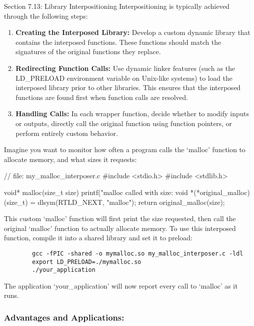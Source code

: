 \begin{notes}{Section 7.13: Library Interpositioning}
    Interpositioning is typically achieved through the following steps:
    \begin{enumerate}
        \item \textbf{Creating the Interposed Library:} Develop a custom dynamic library that contains the interposed functions. These functions should match the signatures of the original functions they replace.
        \item \textbf{Redirecting Function Calls:} Use dynamic linker features (such as the LD\_PRELOAD environment variable on Unix-like systems) to load the interposed library prior to other libraries. 
        This ensures that the interposed functions are found first when function calls are resolved.
        \item \textbf{Handling Calls:} In each wrapper function, decide whether to modify inputs or outputs, directly call the original function using function pointers, or perform entirely custom behavior.
    \end{enumerate}
    
    \begin{highlight}
        Imagine you want to monitor how often a program calls the `malloc' function to allocate memory, and what sizes it requests:
    \begin{code}[C]
    // file: my_malloc_interposer.c
    #include <stdio.h>
    #include <stdlib.h>

    void* malloc(size_t size) {
        printf("malloc called with size: %
        void *(*original_malloc)(size_t) = dlsym(RTLD_NEXT, "malloc");
        return original_malloc(size);
    }
    \end{code}
        This custom `malloc' function will first print the size requested, then call the original `malloc' function to actually allocate memory. To use this interposed function, compile it into a shared 
        library and set it to preload:
        \begin{verbatim}
        gcc -fPIC -shared -o mymalloc.so my_malloc_interposer.c -ldl
        export LD_PRELOAD=./mymalloc.so
        ./your_application
        \end{verbatim}
        The application `your_application' will now report every call to `malloc' as it runs.
    \end{highlight}
    
    \subsubsection*{Advantages and Applications:}
    

\end{notes}

